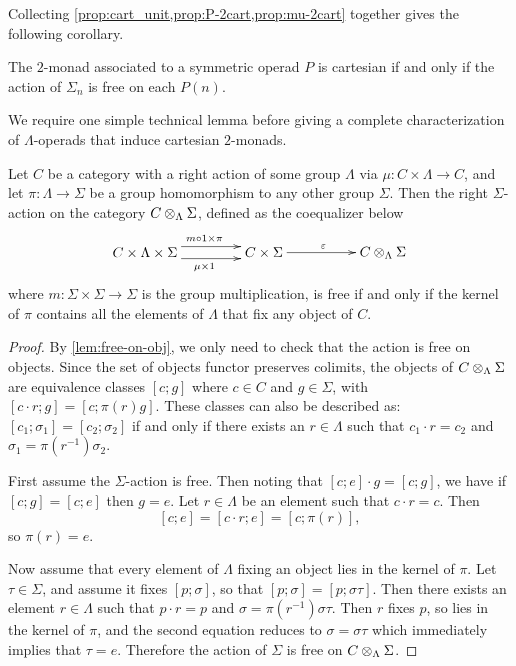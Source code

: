 Collecting \cref{prop:cart_unit,prop:P-2cart,prop:mu-2cart} together gives the following corollary.

\begin{cor}\label{cor:cart_cor}
The $2$-monad associated to a symmetric operad $P$ is cartesian if and only if the action of $\Sigma_n$ is free on each $P(n)$.
\end{cor}

We require one simple technical lemma before giving a complete characterization of $\Lambda$-operads that induce cartesian $2$-monads.

\begin{lem}\label{lem:kernel_lem}
Let $C$ be a category with a right action of some group $\Lambda$ via $\mu \colon C \times \Lambda \to C$, and let $\pi \colon  \Lambda \rightarrow \Sigma$ be a group homomorphism to any other group $\Sigma$. Then the right $\Sigma$-action on the category $C \otimes_{\Lambda} \Sigma$, defined as the coequalizer below
    \[
        \xy
            (0,0)*+{C \times \Lambda \times \Sigma}="00";
            (30,0)*+{C \times \Sigma}="10";
            (60,0)*+{\coeqb{C}{\Sigma}{\Lambda}}="20";
            {\ar@<1ex>^{m \circ 1 \times \pi} "00" ; "10"};
            {\ar@<-1ex>_{\mu \times 1} "00" ; "10"};
            {\ar^{\varepsilon} "10" ; "20"};
        \endxy
    \]
where $m \colon \Sigma \times \Sigma \to \Sigma$ is the group multiplication,
is free if and only if the kernel of $\pi$ contains all the elements of $\Lambda$ that fix any object of $C$.
\end{lem}
\begin{proof}
By \cref{lem:free-on-obj}, we only need to check that the action is free on objects.
Since the set of objects functor preserves colimits, the objects of $C \otimes_{\Lambda} \Sigma$ are equivalence classes $[c;g]$ where $c \in C$ and $g \in \Sigma$, with $[c\cdot r;g] = [c; \pi(r)g]$. 
These classes can also be described as: $[c_1; \sigma_1] = [c_2; \sigma_2]$ if and only if there exists an $r \in \Lambda$ such that $ c_1 \cdot r = c_2$ and $\sigma_1 = \pi(r^{-1})\sigma_2$.

First assume the $\Sigma$-action is free. Then noting that $[c;e]\cdot g =[c;g]$, we have if $[c;g] = [c;e]$ then $g=e$. Let $r \in \Lambda$ be an element such that $c\cdot r = c$. Then
  \[
    [c;e] = [c\cdot r; e] = [c; \pi(r)],
  \]
so $\pi(r) = e$.

Now assume that every element of $\Lambda$ fixing an object lies in the kernel of $\pi$. Let $\tau \in \Sigma$, and assume it fixes $[p; \sigma]$, so that $[p; \sigma] = [p; \sigma \tau]$.
Then there exists an element $r \in \Lambda$ such that $p\cdot r = p$ and $\sigma = \pi(r^{-1})\sigma\tau$. 
Then $r$ fixes $p$, so lies in the kernel of $\pi$, and the second equation reduces to $\sigma = \sigma \tau$ which immediately implies that $\tau = e$. Therefore the action of $\Sigma$ is free on $C \otimes_{\Lambda} \Sigma$.
\end{proof}

